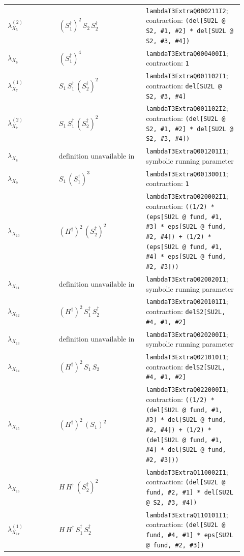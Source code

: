 \documentclass[9pt]{article}
\begin{document}
\begin{longtable}{@{}p{0.20\linewidth}p{0.34\linewidth}p{0.38\linewidth}@{}}
$\lambda_{X_{5}}^{(2)}$ & $(S_1^\dagger)^{2}\,S_2\,S_2^\dagger$ & \texttt{lambdaT3ExtraQ000211I2}; contraction: \texttt{(del[SU2L @ S2, \#1, \#2] * del[SU2L @ S2, \#3, \#4])} \\
$\lambda_{X_{6}}$ & $(S_1^\dagger)^{4}$ & \texttt{lambdaT3ExtraQ000400I1}; contraction: \texttt{1} \\
$\lambda_{X_{7}}^{(1)}$ & $S_1\,S_1^\dagger\,(S_2^\dagger)^{2}$ & \texttt{lambdaT3ExtraQ001102I1}; contraction: \texttt{del[SU2L @ S2, \#3, \#4]} \\
$\lambda_{X_{7}}^{(2)}$ & $S_1\,S_1^\dagger\,(S_2^\dagger)^{2}$ & \texttt{lambdaT3ExtraQ001102I2}; contraction: \texttt{(del[SU2L @ S2, \#1, \#2] * del[SU2L @ S2, \#3, \#4])} \\
$\lambda_{X_{8}}$ & $\text{definition unavailable in registry}$ & \texttt{lambdaT3ExtraQ001201I1}; symbolic running parameter \\
$\lambda_{X_{9}}$ & $S_1\,(S_1^\dagger)^{3}$ & \texttt{lambdaT3ExtraQ001300I1}; contraction: \texttt{1} \\
$\lambda_{X_{10}}$ & $(H^\dagger)^{2}\,(S_2^\dagger)^{2}$ & \texttt{lambdaT3ExtraQ020002I1}; contraction: \texttt{((1/2) * (eps[SU2L @ fund, \#1, \#3] * eps[SU2L @ fund, \#2, \#4]) + (1/2) * (eps[SU2L @ fund, \#1, \#4] * eps[SU2L @ fund, \#2, \#3]))} \\
$\lambda_{X_{11}}$ & $\text{definition unavailable in registry}$ & \texttt{lambdaT3ExtraQ020020I1}; symbolic running parameter \\
$\lambda_{X_{12}}$ & $(H^\dagger)^{2}\,S_1^\dagger\,S_2^\dagger$ & \texttt{lambdaT3ExtraQ020101I1}; contraction: \texttt{delS2[SU2L, \#4, \#1, \#2]} \\
$\lambda_{X_{13}}$ & $\text{definition unavailable in registry}$ & \texttt{lambdaT3ExtraQ020200I1}; symbolic running parameter \\
$\lambda_{X_{14}}$ & $(H^\dagger)^{2}\,S_1\,S_2$ & \texttt{lambdaT3ExtraQ021010I1}; contraction: \texttt{delS2[SU2L, \#4, \#1, \#2]} \\
$\lambda_{X_{15}}$ & $(H^\dagger)^{2}\,(S_1)^{2}$ & \texttt{lambdaT3ExtraQ022000I1}; contraction: \texttt{((1/2) * (del[SU2L @ fund, \#1, \#3] * del[SU2L @ fund, \#2, \#4]) + (1/2) * (del[SU2L @ fund, \#1, \#4] * del[SU2L @ fund, \#2, \#3]))} \\
$\lambda_{X_{16}}$ & $H\,H^\dagger\,(S_2^\dagger)^{2}$ & \texttt{lambdaT3ExtraQ110002I1}; contraction: \texttt{(del[SU2L @ fund, \#2, \#1] * del[SU2L @ S2, \#3, \#4])} \\
$\lambda_{X_{17}}^{(1)}$ & $H\,H^\dagger\,S_1^\dagger\,S_2^\dagger$ & \texttt{lambdaT3ExtraQ110101I1}; contraction: \texttt{(del[SU2L @ fund, \#4, \#1] * eps[SU2L @ fund, \#2, \#3])} \\

\end{longtable}
\end{document}
